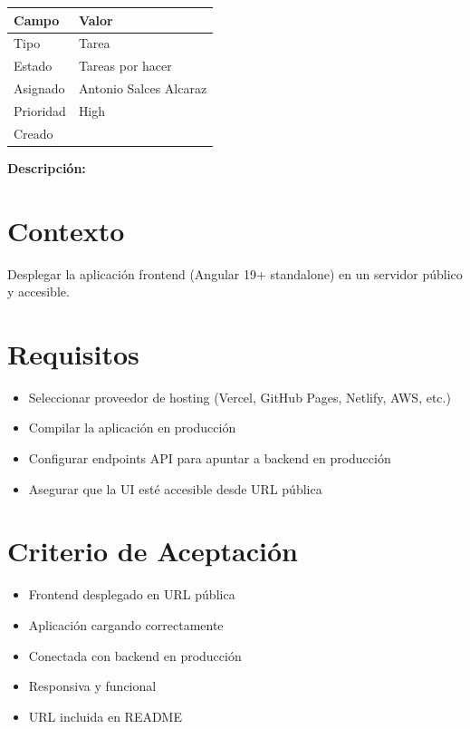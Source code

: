 \documentclass[
  spanish,
  11pt,
]{report}
\newcounter{none} %
\providecommand{\tightlist}{%
  \setlength{\itemsep}{0pt}\setlength{\parskip}{0pt}}
\begin{document}
{\def\LTcaptype{none} %
\begin{longtable}[]{@{}ll@{}}
\toprule\noalign{}
Campo & Valor \\
\midrule\noalign{}
\endhead
\bottomrule\noalign{}
\endlastfoot
Tipo & Tarea \\
Estado & Tareas por hacer \\
Asignado & Antonio Salces Alcaraz \\
Prioridad & High \\
Creado & \\
\end{longtable}
}

\textbf{Descripción:}

\section{Contexto}\label{contexto-8}

Desplegar la aplicación frontend (Angular 19+ standalone) en un servidor
público y accesible.

\section{Requisitos}\label{requisitos-7}

\begin{itemize}
\tightlist
\item
  Seleccionar proveedor de hosting (Vercel, GitHub Pages, Netlify, AWS,
  etc.)
\item
  Compilar la aplicación en producción
\item
  Configurar endpoints API para apuntar a backend en producción
\item
  Asegurar que la UI esté accesible desde URL pública
\end{itemize}

\section{Criterio de Aceptación}\label{criterio-de-aceptaciuxf3n-7}

\begin{itemize}
\tightlist
\item[$\square$]
  Frontend desplegado en URL pública
\item[$\square$]
  Aplicación cargando correctamente
\item[$\square$]
  Conectada con backend en producción
\item[$\square$]
  Responsiva y funcional
\item[$\square$]
  URL incluida en README
\end{itemize}
\end{document}
